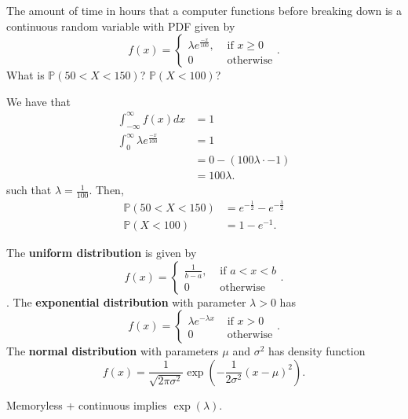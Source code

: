 \begin{eg}
	The amount of time in hours that a computer functions before breaking down is a continuous random variable with PDF given by \[
		f(x) = \begin{cases}
			\lambda e^{\frac{-x}{100}} , &\text{ if } x\ge 0\\
			0 &\text{ otherwise}
		\end{cases}
	.\] What is \( \mathbb{P}(50 < X < 150) \)? \( \mathbb{P}(X<100) \)?
\end{eg}
\begin{explanation}
	We have that 
	\begin{align*}
		\int_{-\infty}^{\infty} f(x) dx &= 1 \\
		\int_{0}^{\infty}\lambda e^{\frac{-x}{100}}  &= 1 \\
		&= 0 - (100\lambda \cdot -1) \\
		&= 100\lambda 
	.\end{align*}
	such that \( \lambda =\frac{1}{100} \). Then,
	\begin{align*}
		\mathbb{P}(50 < X < 150) &= e^{-\frac{1}{2}} - e^{-\frac{3}{2}}   \\
		\mathbb{P}(X < 100) &= 1-e^{-1} 
	.\end{align*}
\end{explanation}

\begin{definition}
	The \textbf{uniform distribution} is given by \[
		f(x) = \begin{cases}
			\frac{1}{b-a}, &\text{ if }a<x<b\\
			0 &\text{ otherwise}
		\end{cases}
	.\]. The \textbf{exponential distribution} with parameter \( \lambda >0 \) has \[
		f(x) = \begin{cases}
			\lambda e^{-\lambda x} &\text{ if } x>0  \\
			0 &\text{ otherwise}
		\end{cases}
	.\] The \textbf{normal distribution} with parameters \( \mu  \) and \( \sigma ^{2}  \) has density function \[
		f(x) = \frac{1}{\sqrt{2\pi \sigma ^{2} } }\exp \left( -\frac{1}{2\sigma ^{2} } (x-\mu )^{2}  \right) 
	.\] 
\end{definition}

\begin{theorem}
	Memoryless + continuous implies \( \exp(\lambda ) \).
\end{theorem}

